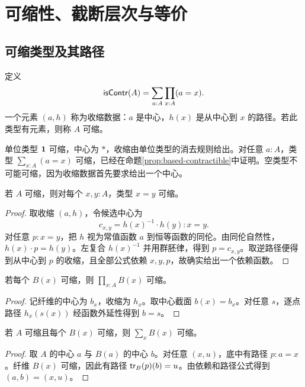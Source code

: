 \chapter{可缩性、截断层次与等价}
\section{可缩类型及其路径}
\begin{definition}[可缩性]
定义
\[
\mathsf{isContr}(A)=\sum_{a:A}\prod_{x:A}(a=x).
\]
一个元素 $(a,h)$ 称为收缩数据：$a$ 是中心，$h(x)$ 是从中心到 $x$ 的路径。若此类型有元素，则称 $A$ 可缩。
\end{definition}
\begin{example}
单位类型 $\mathbf 1$ 可缩，中心为 $*$，收缩由单位类型的消去规则给出。对任意 $a:A$，类型 $\sum_{x:A}(a=x)$ 可缩，已经在命题\ref{prop:based-contractible}中证明。空类型不可能可缩，因为收缩数据首先要求给出一个中心。
\end{example}
\begin{lemma}[可缩类型的路径类型]
若 $A$ 可缩，则对每个 $x,y:A$，类型 $x=y$ 可缩。
\end{lemma}
\begin{proof}
取收缩 $(a,h)$，令候选中心为
\[
c_{x,y}=h(x)^{-1}\cdot h(y):x=y.
\]
对任意 $p:x=y$，把 $h$ 视为常值函数 $a$ 到恒等函数的同伦。由同伦自然性，$h(x)\cdot p=h(y)$。左复合 $h(x)^{-1}$ 并用群胚律，得到 $p=c_{x,y}$。取逆路径便得到从中心到 $p$ 的收缩，且全部公式依赖 $x,y,p$，故确实给出一个依赖函数。
\end{proof}
\begin{proposition}[可缩纤维的积]
若每个 $B(x)$ 可缩，则 $\prod_{x:A}B(x)$ 可缩。
\end{proposition}
\begin{proof}
记纤维的中心为 $b_x$，收缩为 $h_x$。取中心截面 $b(x)=b_x$。对任意 $s$，逐点路径 $h_x(s(x))$ 经函数外延性得到 $b=s$。
\end{proof}
\begin{proposition}[可缩底与可缩纤维]
若 $A$ 可缩且每个 $B(x)$ 可缩，则 $\sum_xB(x)$ 可缩。
\end{proposition}
\begin{proof}
取 $A$ 的中心 $a$ 与 $B(a)$ 的中心 $b$。对任意 $(x,u)$，底中有路径 $p:a=x$。纤维 $B(x)$ 可缩，因此有路径 $\mathsf{tr}_B(p)(b)=u$。由依赖和路径公式得到 $(a,b)=(x,u)$。
\end{proof}

